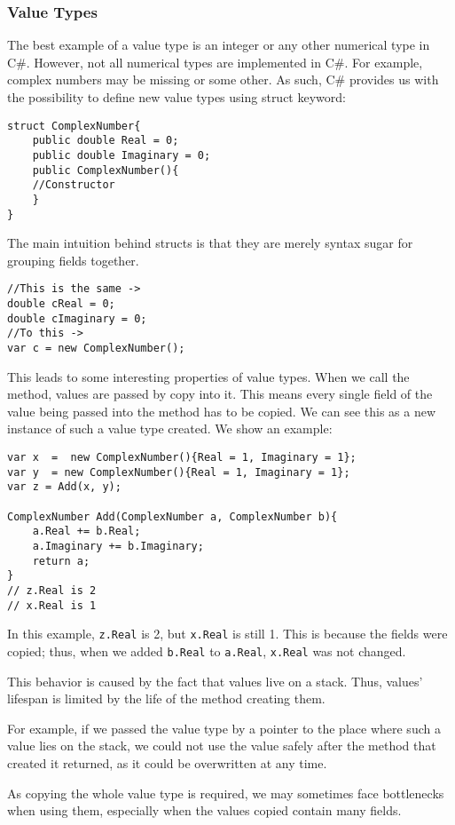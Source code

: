 \subsubsection{Value Types}
The best example of a value type is an integer or any other numerical type in C\#. However, not all numerical types are implemented in C\#. For example, complex numbers may be missing or some other. As such, C\# provides us with the possibility to define new value types using struct keyword:
\begin{lstlisting}
struct ComplexNumber{
    public double Real = 0;
    public double Imaginary = 0;
    public ComplexNumber(){ 
    //Constructor
    }
}
\end{lstlisting}
The main intuition behind structs is that they are merely syntax sugar for grouping fields together. 
\begin{lstlisting}
//This is the same ->
double cReal = 0;
double cImaginary = 0;
//To this ->
var c = new ComplexNumber();
\end{lstlisting}
This leads to some interesting properties of value types.
When we call the method, values are passed by copy into it. This means every single field of the value being passed into the method has to be copied. We can see this as a new instance of such a value type created. We show an example:
\begin{lstlisting}
var x  =  new ComplexNumber(){Real = 1, Imaginary = 1};
var y  = new ComplexNumber(){Real = 1, Imaginary = 1};
var z = Add(x, y);

ComplexNumber Add(ComplexNumber a, ComplexNumber b){
    a.Real += b.Real;
    a.Imaginary += b.Imaginary;
    return a;
}
// z.Real is 2
// x.Real is 1
\end{lstlisting}
In this example, \texttt{z.Real} is 2, but \texttt{x.Real} is still 1. This is because the fields were copied; thus, when we added \texttt{b.Real} to \texttt{a.Real}, \texttt{x.Real} was not changed.

This behavior is caused by the fact that values live on a stack. Thus, values' lifespan is limited by the life of the method creating them. 

For example, if we passed the value type by a pointer to the place where such a value lies on the stack, we could not use the value safely after the method that created it returned, as it could be overwritten at any time.

As copying the whole value type is required, we may sometimes face bottlenecks when using them, especially when the values copied contain many fields.

